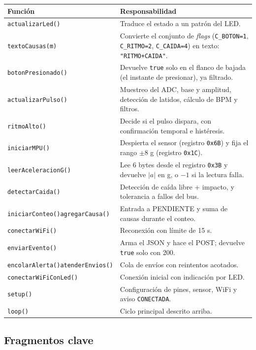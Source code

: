 \documentclass[11pt,a4paper]{article}
\begin{document}
\begin{center}
\begin{tabular}{@{}p{4.4cm} p{11.2cm}@{}}
\toprule
\textbf{Función} & \textbf{Responsabilidad}\\
\midrule
\texttt{actualizarLed()} & Traduce el estado a un patrón del LED.\\
\texttt{textoCausas(m)} & Convierte el conjunto de \emph{flags} (\texttt{C\_BOTON=1}, \texttt{C\_RITMO=2}, \texttt{C\_CAIDA=4}) en texto: \texttt{"RITMO+CAIDA"}.\\
\texttt{botonPresionado()} & Devuelve \texttt{true} solo en el flanco de bajada (el instante de presionar), ya filtrado.\\
\texttt{actualizarPulso()} & Muestreo del ADC, base y amplitud, detección de latidos, cálculo de BPM y filtros.\\
\texttt{ritmoAlto()} & Decide si el pulso dispara, con confirmación temporal e histéresis.\\
\texttt{iniciarMPU()} & Despierta el sensor (registro \texttt{0x6B}) y fija el rango $\pm 8$ g (registro \texttt{0x1C}).\\
\texttt{leerAceleracionG()} & Lee 6 bytes desde el registro \texttt{0x3B} y devuelve $|a|$ en g, o $-1$ si la lectura falla.\\
\texttt{detectarCaida()} & Detección de caída libre + impacto, y tolerancia a fallos del bus.\\
\texttt{iniciarConteo()}\newline\texttt{agregarCausa()} & Entrada a PENDIENTE y suma de causas durante el conteo.\\
\texttt{conectarWiFi()} & Reconexión con límite de 15 s.\\
\texttt{enviarEvento()} & Arma el JSON y hace el POST; devuelve \texttt{true} solo con 200.\\
\texttt{encolarAlerta()}\newline\texttt{atenderEnvios()} & Cola de envíos con reintentos acotados.\\
\texttt{conectarWiFiConLed()} & Conexión inicial con indicación por LED.\\
\texttt{setup()} & Configuración de pines, sensor, WiFi y aviso \texttt{CONECTADA}.\\
\texttt{loop()} & Ciclo principal descrito arriba.\\
\bottomrule
\end{tabular}
\end{center}

\subsection{Fragmentos clave}
\end{document}
